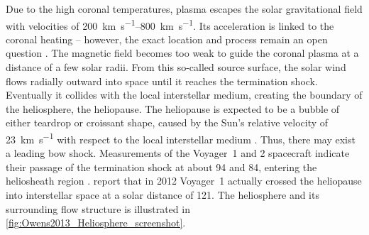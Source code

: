 Due to the high coronal temperatures, plasma escapes the solar gravitational field \citep{Parker1958} with velocities of \SIrange{200}{800}{\km\per\s}. Its acceleration is linked to the coronal heating -- however, the exact location and process remain an open question \citep{Hollweg1985,McComas2007,Fox2015}. The magnetic field becomes too weak to guide the coronal plasma at a distance of a few solar radii. From this so-called source surface, the solar wind flows radially outward into space until it reaches the termination shock. Eventually it collides with the local interstellar medium, creating the boundary of the heliosphere, the heliopause. The heliopause is expected to be a bubble of either teardrop or croissant shape, caused by the Sun's relative velocity of \SI{23}{\km\per\s} with respect to the local interstellar medium \citep{Owens2013, Opher2015}. Thus, there may exist a leading bow shock. Measurements of the Voyager~1 and 2 spacecraft indicate their passage of the termination shock at about \SI{94}{\au} and \SI{84}{\au}, entering the heliosheath region \citep{Owens2013}. \citet{Gurnett2013} report that in 2012 Voyager~1 actually crossed the heliopause into interstellar space at a solar distance of \SI{121}{\au}. The heliosphere and its surrounding flow structure is illustrated in \autoref{fig:Owens2013_Heliosphere_screenshot}.
